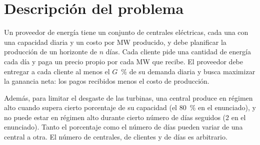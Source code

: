\section{Descripción del problema}

Un proveedor de energía tiene un conjunto de centrales eléctricas, cada una con una capacidad diaria y un costo por MW producido, y debe planificar la producción de un horizonte de $n$ días. Cada cliente pide una cantidad de energía cada día y paga un precio propio por cada MW que recibe. El proveedor debe entregar a cada cliente al menos el $G$~\% de su demanda diaria y busca maximizar la ganancia neta: los pagos recibidos menos el costo de producción.

Además, para limitar el desgaste de las turbinas, una central produce en régimen alto cuando supera cierto porcentaje de su capacidad (el 80~\% en el enunciado), y no puede estar en régimen alto durante cierto número de días seguidos (2 en el enunciado). Tanto el porcentaje como el número de días pueden variar de una central a otra. El número de centrales, de clientes y de días es arbitrario.
